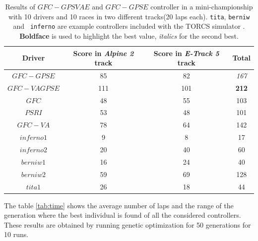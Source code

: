 \documentclass[10pt,journal,compsoc]{IEEEtran}
\begin{document}
\begin{table}[ht]
	\centering
	{\scriptsize
		\caption{ Results of $GFC-GPSVAE$ and $GFC-GPSE$ controller in a mini-championship with 10 drivers and 10
			races in two different tracks(20 laps each). {\tt tita}, {\tt berniw} and {\tt
				inferno} are example controllers included with the TORCS
			simulator \cite{torcs4}.  {\bf Boldface} is
                        used to highlight the best value, {\em italics} for the second
                    best.}
		{
			\begin{tabular}{|c|c|c||c|}
				\hline
				Driver&Score in \textit{Alpine 2} track &Score in \textit{E-Track 5} track &Total\\
				\hline
				\hline
$GFC-GPSE$&	85&	82&	{\em 167}\\
$GFC-VAGPSE$&111&101&            {\bf 212}\\
$GFC$&		48&	55&	103\\
$PSRI$&		53&	48&	101\\
$GFC-VA$&	78&	64&	142\\
$inferno1$&	9&	8&	17\\
$inferno2$&	20&	40&	60\\
$berniw1$&	16&	24&	40\\
$berniw2$&	59&	69&	128\\
$tita1$&	26&	18&	44\\
					\hline
				
			\end{tabular}
		}\label{tab:allsresults}
	}
\end{table}
%




The table \ref{tab:time} shows the average number of laps %
and the range of the generation where the best individual is found of all the considered controllers. These results are obtained by running genetic
optimization for 50 generations for 10 runs.  
\end{document}

